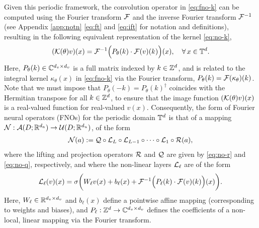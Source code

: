 \documentclass[reqno,a4paper]{amsart}
\begin{document}
Given this periodic framework, the convolution operator in \eqref{eq:fno-k} can be computed using the Fourier transform $\mathcal{F}$ and the inverse Fourier transform $\mathcal{F}^{-1}$ (see Appendix \ref{app:notn} \eqref{eq:ft} and \eqref{eq:ift} for notation and definitions), resulting in the following equivalent representation of the kernel \eqref{eq:no-k},
\begin{align} \label{eq:fnok}
(\mathcal{K}(\theta)v)(x)
=
\mathcal{F}^{-1}\Big( 
P_\theta(k) \cdot \mathcal{F}(v)(k) 
\Big)(x),
\quad
\forall \, x \in \mathbb{T}^d.
\end{align}
Here, $P_\theta(k) \in \mathbb{C}^{d_v \times d_v}$ is a full matrix indexed by $k \in \mathbb{Z}^d$, and is related to the integral kernel $\kappa_\theta(x)$ in \eqref{eq:fno-k} via the Fourier transform, $P_\theta(k) = \mathcal{F}(\kappa_\theta)(k)$. Note that we must impose that $P_\theta(-k) = P_\theta(k)^\dagger$ coincides with the Hermitian transpose for all $k\in \mathbb{Z}^d$, to ensure that the image function $(\mathcal{K}(\theta)v)(x)$ is a real-valued function for real-valued $v(x)$. Consequently, the form of Fourier neural operators (FNOs) for the periodic domain $\mathbb{T}^d$ is that of a mapping $\mathcal{N}: \mathcal{A}(D;\mathbb{R}^{d_a}) \to \mathcal{U}(D;\mathbb{R}^{d_u})$, of the form 
\begin{align} \label{eq:fno}
\mathcal{N}(a)
:=
\mathcal{Q} \circ \mathcal{L}_{L} \circ \mathcal{L}_{L-1} \circ \dots \circ \mathcal{L}_{1} \circ \mathcal{R}(a),
\end{align}
where the lifting and projection operators $\mathcal{R}$ and $\mathcal{Q}$ are given by \eqref{eq:no-r} and \eqref{eq:no-q}, respectively, and where the non-linear layers $\mathcal{L}_\ell$ are of the form 
\begin{align} \label{eq:fno-layer}
\mathcal{L}_\ell(v)(x)
=
\sigma
\bigg(
W_\ell v(x) + b_\ell(x) + \mathcal{F}^{-1} \Big(P_{\ell}(k) \cdot \mathcal{F}(v)(k)\Big)(x)
\bigg).
\end{align}
Here, $W_\ell \in \mathbb{R}^{d_v\times d_v}$ and $b_\ell(x)$ define a pointwise affine mapping (corresponding to weights and biases), and $P_{\ell}: \mathbb{Z}^d \to \mathbb{C}^{d_v\times d_v}$ defines the coefficients of a non-local, linear mapping via the Fourier transform.
\end{document}
